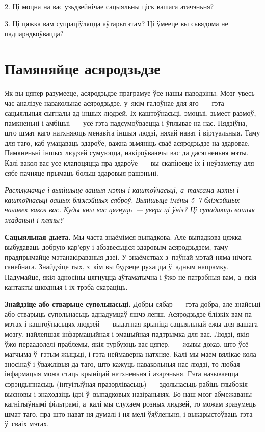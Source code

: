 2. Ці моцна на вас узьдзейнічае сацыяльны ціск вашага атачэньня?

3. Ці цяжка вам супраціўляцца аўтарытэтам? Ці ўмееце вы сьвядома не падпарадкоўвацца?


\section{Памяняйце асяродзьдзе}

Як вы цяпер разумееце, асяродзьдзе праграмуе ўсе нашы паводзіны. Мозг увесь час аналізуе навакольнае асяродзьдзе, у~якім галоўнае для яго~--- гэта сацыяльныя сыгналы ад іншых людзей. Іх каштоўнасьці, эмоцыі, зьмест размоў, памкненьні і амбіцыі~--- усё гэта падсумоўваецца і ўплывае на нас. Нядзіўна, што шмат каго натхняюць менавіта іншыя людзі, няхай нават і віртуальныя. Таму для таго, каб умацаваць здароўе, важна зьмяніць сваё асяродзьдзе на здаровае. Памкненьні іншых людзей сумуюцца, накіроўваючы вас да дасягненьня мэты. Калі вакол вас усе клапоцяцца пра здароўе~--- вы скапіюеце іх і неўзаметку для сябе пачняце прымаць больш здаровыя рашэньні.

\emph{Растлумачце і выпішыце вашыя мэты і каштоўнасьці, а~таксама мэты і каштоўнасьці вашых бліжэйшых сяброў. Выпішыце імёны 5--7 бліжэйшых чалавек вакол вас. Куды яны вас цягнуць~--- уверх ці ўніз? Ці супадаюць вашыя жаданьні і пляны?}

\textbf{Сацыяльная дыета.} Мы часта знаёмімся выпадкова. Але выпадкова цяжка выбудаваць добрую кар'еру і абзавесьціся здаровым асяродзьдзем, таму прадпрымайце мэтанакіраваныя дзеі. У знаёмствах з~пэўнай мэтай няма нічога ганебнага. Знайдзіце тых, з~кім вы будзеце рухацца ў~адным напрамку. Падумайце, якія адносіны цягнуцца аўтаматычна і ўжо не патрэбныя вам, а~якія кантакты шкодныя і іх трэба скараціць.

\textbf{Знайдзіце або стварыце супольнасьці.} Добры сябар~--- гэта добра, але знайсьці або стварыць супольнасьць аднадумцаў яшчэ лепш. Асяродзьдзе блізкіх вам па мэтах і каштоўнасьцях людзей~--- выдатная крыніца сацыяльнай ежы для вашага мозгу, найлепшая інфармацыйная і эмацыйная падтрымка для вас. Людзі, якія ўжо пераадолелі праблемы, якія турбуюць вас цяпер,~--- жывы доказ, што ўсё магчыма ў~гэтым жыцьці, і гэта неймаверна натхняе. Калі мы маем вялікае кола зносінаў і ўважлівыя да таго, што кажуць навакольныя нас людзі, то любая інфармацыя можа стаць крыніцай натхненьня і азарэньня. Гэта называецца сэрэндыпнасьць (інтуітыўная празорлівасьць)~--- здольнасьць рабіць глыбокія высновы і знаходзіць ідэі ў~выпадковых назіраньнях. Бо наш мозг абмежаваны кагнітыўнымі фільтрамі, а~калі мы слухаем розных людзей, то можам зразумець шмат таго, пра што нават ня думалі і ня мелі ўяўленьня, і выкарыстоўваць гэта ў~сваіх мэтах.

